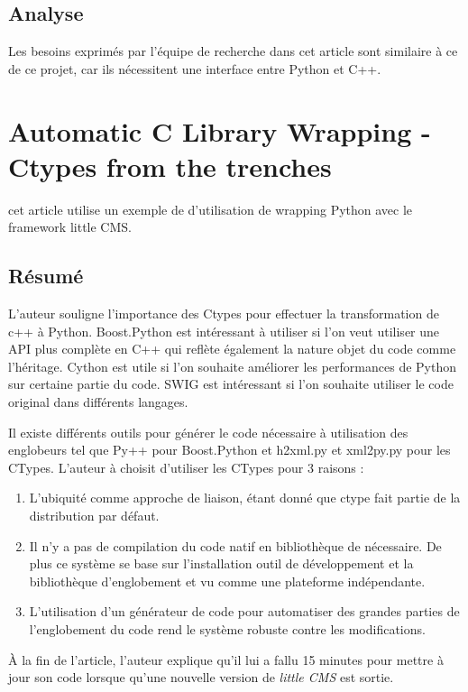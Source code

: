 \documentclass[11pt, french, screen]{report-rd-info}
\begin{document}
\subsection{Analyse}

Les besoins exprimés par l'équipe de recherche dans cet article sont similaire à ce de ce projet, car ils nécessitent une interface entre Python et C++.

\section{Automatic C Library Wrapping - Ctypes from the trenches}

cet article \cite{2008ACLWCFTTGuy} utilise un exemple de d'utilisation de wrapping Python avec le framework little CMS. 

\subsection{Résumé}

L'auteur souligne l'importance des Ctypes pour effectuer la transformation de c++ à Python. Boost.Python est intéressant à utiliser si l'on veut utiliser une API plus complète en C++ qui reflète également la nature objet du code comme l'héritage. Cython est utile si l'on souhaite améliorer les performances de Python sur certaine partie du code. SWIG est intéressant si l'on souhaite utiliser le code original dans différents langages.

Il existe différents outils pour générer le code nécessaire à utilisation des englobeurs tel que Py++ pour Boost.Python et h2xml.py et xml2py.py pour les CTypes. L'auteur à choisit d'utiliser les CTypes pour 3 raisons :
\begin{enumerate}
\item L'ubiquité comme approche de liaison, étant donné que ctype fait partie de la distribution par défaut.
\item Il n'y a pas de compilation du code natif en bibliothèque de nécessaire. De plus ce système se base sur l'installation outil de développement et la bibliothèque d'englobement et vu comme une plateforme indépendante.
\item L'utilisation d'un générateur de code pour automatiser des grandes parties de l'englobement du code rend le système robuste contre les modifications.
\end{enumerate}

À la fin de l'article, l'auteur explique qu'il lui a fallu 15 minutes pour mettre à jour son code lorsque qu'une nouvelle version de \emph{little CMS} est sortie.
\end{document}
